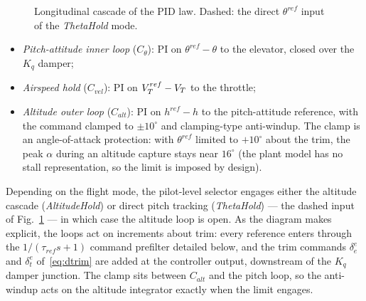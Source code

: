 \begin{figure}[!t]
{}
\caption{Longitudinal cascade of the PID law. Dashed: the direct
$\theta^{ref}$ input of the \emph{ThetaHold} mode.}
\label{fig:pid-lon}
\end{figure}
\begin{itemize}
  \item \emph{Pitch-attitude inner loop} ($C_{\theta}$): PI on
        $\theta^{ref}-\theta$ to the elevator, closed over the $K_q$ damper;
  \item \emph{Airspeed hold} ($C_{vel}$): PI on $V_T^{ref}-V_T$ to the
        throttle;
  \item \emph{Altitude outer loop} ($C_{alt}$): PI on $h^{ref}-h$ to the
        pitch-attitude reference, with the command clamped to
        $\pm10^\circ$ and clamping-type anti-windup. The clamp is an
        angle-of-attack protection: with $\theta^{ref}$ limited to
        $+10^\circ$ about the trim, the peak $\alpha$ during an altitude
        capture stays near $16^\circ$ (the plant model has no stall
        representation, so the limit is imposed by design).
\end{itemize}
Depending on the flight mode, the pilot-level selector engages either the
altitude cascade (\emph{AltitudeHold}) or direct pitch tracking
(\emph{ThetaHold}) --- the dashed input of Fig.~\ref{fig:pid-lon} ---
in which case the altitude loop is open. As the diagram makes
explicit, the loops act on increments about trim: every reference
enters through the $1/(\tau_{ref}s+1)$ command prefilter detailed
below, and the trim commands $\delta_e^{e}$ and $\delta_t^{e}$
of~\eqref{eq:dtrim} are added at the controller output, downstream of
the $K_q$ damper junction. The clamp sits between $C_{alt}$ and the
pitch loop, so the anti-windup acts on the altitude integrator
exactly when the limit engages.

